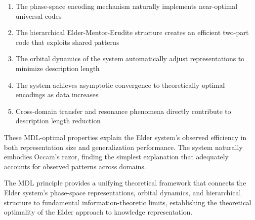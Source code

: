 \begin{enumerate}
    \item The phase-space encoding mechanism naturally implements near-optimal universal codes
    \item The hierarchical Elder-Mentor-Erudite structure creates an efficient two-part code that exploits shared patterns
    \item The orbital dynamics of the system automatically adjust representations to minimize description length
    \item The system achieves asymptotic convergence to theoretically optimal encodings as data increases
    \item Cross-domain transfer and resonance phenomena directly contribute to description length reduction
\end{enumerate}

These MDL-optimal properties explain the Elder system's observed efficiency in both representation size and generalization performance. The system naturally embodies Occam's razor, finding the simplest explanation that adequately accounts for observed patterns across domains.

The MDL principle provides a unifying theoretical framework that connects the Elder system's phase-space representations, orbital dynamics, and hierarchical structure to fundamental information-theoretic limits, establishing the theoretical optimality of the Elder approach to knowledge representation.